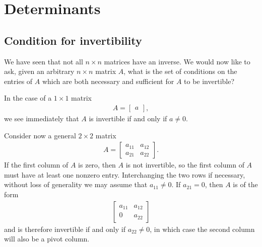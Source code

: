 \documentclass[12pt,letterpaper,reqno]{article}
\numberwithin{equation}{section}
\begin{document}
\section{Determinants}
\subsection{Condition for invertibility}
We have seen that not all $n \times n$ matrices have an inverse. We would now like to ask, given an arbitrary $n \times n$ matrix $A$, what is the set of conditions on the entries of $A$ which are both necessary and sufficient for $A$ to be invertible?

In the case of a $1 \times 1$ matrix
\begin{align*}
	A=\begin{bmatrix}
		a
	\end{bmatrix},
\end{align*}
we see immediately that $A$ is invertible if and only if $a \neq 0$.

Consider now a general $2 \times 2$ matrix
\begin{align*}
	A=\begin{bmatrix}
		a_{11} & a_{12} \\
		a_{21} & a_{22}
	\end{bmatrix}.
\end{align*}
If the first column of $A$ is zero, then $A$ is not invertible, so the first column of $A$ must have at least one nonzero entry. Interchanging the two rows if necessary, without loss of generality we may assume that $a_{11} \neq 0$. If $a_{21}=0$, then $A$ is of the form
\begin{align*}
	\begin{bmatrix}
		a_{11} & a_{12} \\
		0 & a_{22}
	\end{bmatrix}
\end{align*}
and is therefore invertible if and only if $a_{22} \neq 0$, in which case the second column will also be a pivot column.
\end{document}
